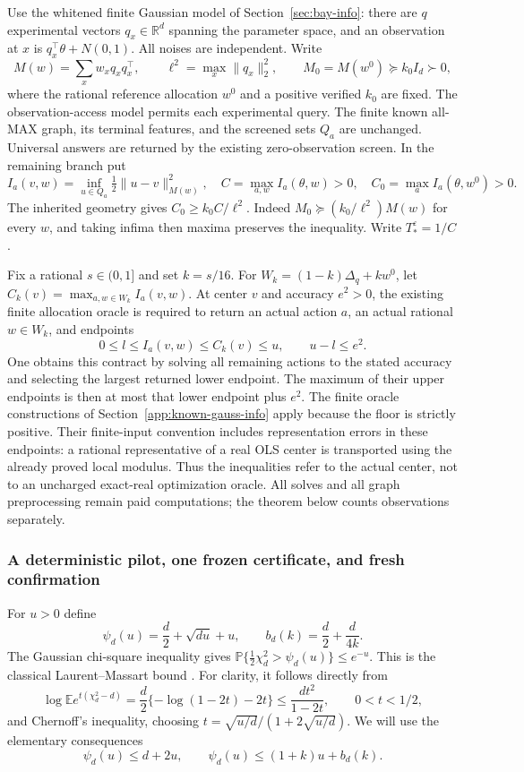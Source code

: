\documentclass{article}
\theoremstyle{plain}
\theoremstyle{definition}
\begin{document}
Use the whitened finite Gaussian model of Section~\ref{sec:bay-info}:
there are $q$ experimental vectors $q_x\in\mathbb R^d$ spanning the
parameter space, and an observation at $x$ is $q_x^\top\theta+N(0,1)$.
All noises are independent.  Write
\[
 M(w)=\sum_xw_xq_xq_x^\top,\qquad
 \ell^2=\max_x\|q_x\|_2^2,
 \qquad M_0=M(w^0)\succeq k_0I_d\succ0,
\]
where the rational reference allocation $w^0$ and a positive verified
$k_0$ are fixed.  The observation-access model permits each experimental
query.  The finite known all-MAX graph, its terminal features, and the
screened sets $Q_a$ are unchanged.  Universal answers are returned by the
existing zero-observation screen.  In the remaining branch put
\[
 I_a(v,w)=\inf_{u\in Q_a}\tfrac12\|u-v\|_{M(w)}^2,
 \quad C=\max_{a,w}I_a(\theta,w)>0,
 \quad C_0=\max_a I_a(\theta,w^0)>0.
\]
The inherited geometry gives $C_0\ge k_0C/\ell^2$.  Indeed
$M_0\succeq(k_0/\ell^2)M(w)$ for every $w$, and taking infima
then maxima preserves the inequality.  Write $T_*^\varepsilon=1/C$.

Fix a rational $s\in(0,1]$ and set $k=s/16$.  For
$W_k=(1-k)\Delta_q+kw^0$, let
$C_k(v)=\max_{a,w\in W_k}I_a(v,w)$.  At center $v$ and accuracy
$e^2>0$, the existing finite allocation oracle is required to return an
actual action $a$, an actual rational $w\in W_k$, and endpoints
\begin{equation}
 0\le l\le I_a(v,w)\le C_k(v)\le u,
 \qquad u-l\le e^2.
 \label{eq:v10g-oracle}
\end{equation}
One obtains this contract by solving all remaining actions to the stated
accuracy and selecting the largest returned lower endpoint.  The maximum
of their upper endpoints is then at most that lower endpoint plus $e^2$.
The finite oracle constructions of Section~\ref{app:known-gauss-info} apply because the floor is strictly positive.
Their finite-input convention includes representation errors in these
endpoints: a rational representative of a real OLS center is transported
using the already proved local modulus.  Thus the inequalities refer to
the actual center, not to an uncharged exact-real optimization oracle.
All solves and all graph preprocessing remain paid computations; the
theorem below counts observations separately.

\subsubsection{A deterministic pilot, one frozen certificate, and fresh confirmation}

For $u>0$ define
\[
 \psi_d(u)=\frac d2+\sqrt{du}+u,
 \qquad b_d(k)=\frac d2+\frac{d}{4k}.
\]
The Gaussian chi-square inequality gives
$\mathbb P\{\tfrac12\chi_d^2>\psi_d(u)\}\le e^{-u}$.
This is the classical Laurent--Massart bound \citep{laurent2000}.
For clarity, it follows directly from
\[
 \log\mathbb E e^{t(\chi_d^2-d)}
 =\frac d2\{-\log(1-2t)-2t\}
 \le\frac{dt^2}{1-2t},\qquad 0<t<1/2,
\]
and Chernoff's inequality, choosing
$t=\sqrt{u/d}/(1+2\sqrt{u/d})$.
We will use the elementary consequences
\begin{equation}
 \psi_d(u)\le d+2u,
 \qquad \psi_d(u)\le(1+k)u+b_d(k).
 \label{eq:v10g-psi}
\end{equation}
\end{document}
